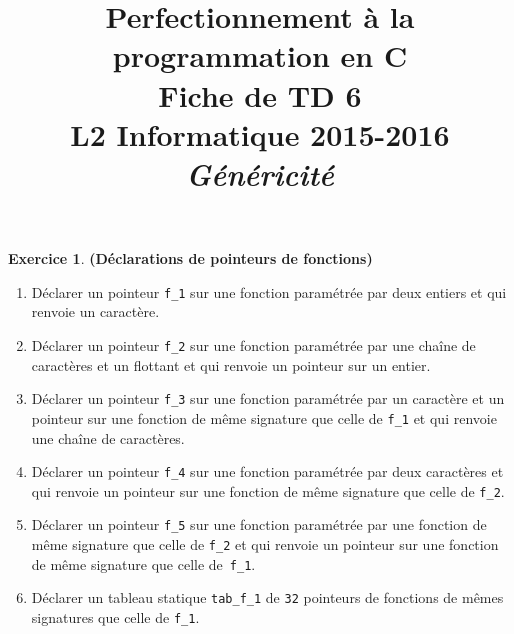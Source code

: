 \documentclass[12pt]{article}
\date{}
\title{{\bf Perfectionnement à la programmation en {\sf C}} \\
    Fiche de TD 6 \\
    {\small L2 Informatique 2015-2016} \\
    {\it \small Généricité}}
\theoremstyle{definition}
\newtheorem{Exercice}{Exercice}
\begin{document}
\maketitle

\begin{Exercice} {\bf (Déclarations de pointeurs de fonctions)}\smallskip
\begin{enumerate}
    \item Déclarer un pointeur {\tt f\_1} sur une fonction paramétrée
    par deux entiers et qui renvoie un caractère.
    \smallskip

    \item Déclarer un pointeur {\tt f\_2} sur une fonction paramétrée
    par une chaîne de caractères et un flottant et qui renvoie un
    pointeur sur un entier.
    \smallskip

    \item Déclarer un pointeur {\tt f\_3} sur une fonction paramétrée
    par un caractère et un pointeur sur une fonction de même signature
    que celle de {\tt f\_1} et qui renvoie une chaîne de caractères.
    \smallskip

    \item Déclarer un pointeur {\tt f\_4} sur une fonction paramétrée
    par deux caractères et qui renvoie un pointeur sur une fonction
    de même signature que celle de {\tt f\_2}.
    \smallskip

    \item Déclarer un pointeur {\tt f\_5} sur une fonction paramétrée
    par une fonction de même signature que celle de {\tt f\_2} et qui
    renvoie un pointeur sur une fonction de même signature que celle
    de~{\tt f\_1}.
    \smallskip

    \item Déclarer un tableau statique {\tt tab\_f\_1} de {\tt 32}
    pointeurs de fonctions de mêmes signatures que celle de {\tt f\_1}.
\end{enumerate}
\end{Exercice}
\bigskip
\end{document}
